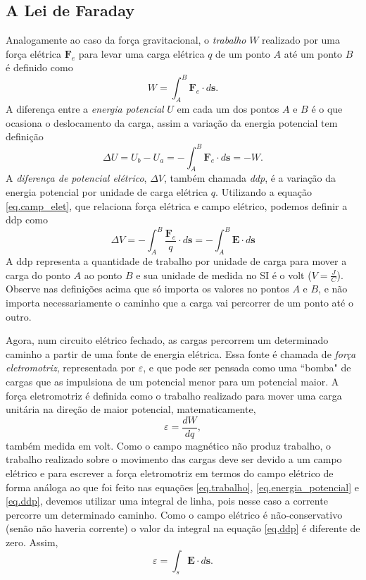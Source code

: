 \subsection{A Lei de Faraday}
Analogamente ao caso da força gravitacional, o \textit{trabalho} $W$ realizado por uma força elétrica $\textbf{F}_e$ para levar uma carga elétrica $q$ de um ponto $A$ até um ponto $B$ é definido como
\begin{equation}\label{eq.trabalho}
W=\int_{A}^{B}\textbf{F}_e\cdot d\textbf{s}.
\end{equation}
A diferença entre a \textit{energia potencial} $U$ em cada um dos pontos $A$ e $B$ é o que ocasiona o deslocamento da carga, assim a variação da energia potencial tem definição
\begin{equation}\label{eq.energia_potencial}
\Delta U=U_b-U_a=-\int_{A}^{B}\textbf{F}_e\cdot d\textbf{s}=-W.
\end{equation}
A \textit{diferença de potencial elétrico}, $\Delta V$, também chamada \textit{ddp}, é a variação da energia potencial por unidade de carga elétrica $q$. Utilizando a equação \ref{eq.camp_elet}, que relaciona força elétrica e campo elétrico, podemos definir a ddp como
\begin{equation}\label{eq.ddp}
\Delta V=-\int_{A}^{B}\frac{\textbf{F}_e}{q}\cdot d\textbf{s}=-\int_{A}^{B}\textbf{E}\cdot d\textbf{s}
\end{equation}
A ddp representa a quantidade de trabalho por unidade de carga para mover a carga do ponto $A$ ao ponto $B$ e sua unidade de medida no SI é o volt ($V=\frac{J}{C}$). Observe nas definições acima que só importa os valores no pontos $A$ e $B$, e não importa necessariamente o caminho que a carga vai percorrer de um ponto até o outro. 

Agora, num circuito elétrico fechado, as cargas percorrem um determinado caminho a partir de uma fonte de energia elétrica. Essa fonte é chamada de \textit{força eletromotriz}, representada por $\varepsilon$, e que pode ser pensada como uma ``bomba" de cargas que as impulsiona de um potencial menor para um potencial maior. A força eletromotriz é definida como o trabalho realizado para mover uma carga unitária na direção de maior potencial, matematicamente,
\begin{equation*}
\varepsilon=\frac{dW}{dq}, 
\end{equation*}
também medida em volt. Como o campo magnético não produz trabalho, o trabalho realizado sobre o movimento das cargas deve ser devido a um campo elétrico e para escrever a força eletromotriz em termos do campo elétrico de forma análoga ao que foi feito nas equações \ref{eq.trabalho}, \ref{eq.energia_potencial} e \ref{eq.ddp}, devemos utilizar uma integral de linha, pois nesse caso a corrente percorre um determinado caminho. Como o campo elétrico é não-conservativo (senão não haveria corrente) o valor da integral na equação \ref{eq.ddp} é diferente de zero. Assim,
\begin{equation}\label{eq.emf_E_nc}
\varepsilon=\int_s\pmb{E}\cdot d\pmb{s}.
\end{equation}
 
